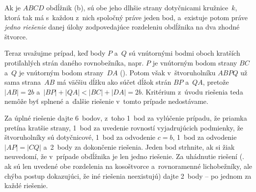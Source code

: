 {Ak je $ABCD$ obdĺžnik (b), sú obe jeho dlhšie strany dotyčnicami kružnice~$k$, ktorá tak má s~každou z~nich spoločný práve jeden bod, a~existuje potom práve {\it jedno riešenie\/} danej úlohy zodpovedajúce rozdeleniu obdĺžnika na dva zhodné štvorce.
%

Teraz uvažujme prípad, keď body $P$ a~$Q$ sú vnútornými bodmi oboch kratších protiľahlých strán daného rovnobežníka, napr. $P$
je vnútorným bodom strany $BC$ a~$Q$ je vnútorným bodom strany~$DA$ (\obr). Potom však v~štvoruholníku $ABPQ$ už sama strana~$AB$ má väčšiu dĺžku ako súčet dĺžok strán $BP$ a~$QA$, pretože $|AB|=2b$ a~$|BP|+|QA|<|BC|+|DA|=2b$. Kritérium z~úvodu riešenia teda nemôže byť splnené a~ďalšie riešenie v~tomto prípade nedostávame.

\nobreak\medskip\petit\noindent
Za úplné riešenie dajte 6~bodov, z~toho 1~bod za vylúčenie prípadu, že priamka pretína kratšie strany, 1~bod za uvedenie rovností vyjadrujúcich podmienky, že štvoruholníky sú dotyčnicové, 1~bod za odvodenie $c=b$, 1~bod za odvodenie $|AP|=|CQ|$ a~2~body za dokončenie riešenia. Jeden bod strhnite, ak si žiak neuvedomí, že v~prípade obdĺžnika je len jedno riešenie. Za uhádnutie riešení (\tj. ak sú len uvedené obe rozdelenia na kosoštvorce a~rovnoramenné lichobežníky, ale chýba postup dokazujúci, že iné riešenia neexistujú) dajte 2~body -- po jednom za každé riešenie.

\endpetit
\bigbreak
}

